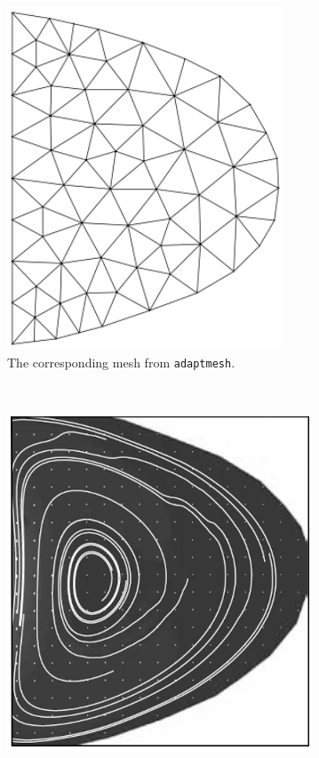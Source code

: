 \documentclass[12pt]{rmstyle}
\begin{document}
\begin{figure}[htbp]
\begin{subfigure}[b]{0.3\textwidth}
    \includegraphics[width=0.9\textwidth]{./esimerkki_2.png}
    \caption{The corresponding mesh from \texttt{adaptmesh}.}
    \label{fig:photomesh}
  \end{subfigure}
  \\
  \begin{subfigure}[b]{0.3\textwidth}
    \centering
    \includegraphics[width=\textwidth]{./esimerkki_3.png}

\end{subfigure}
\end{figure}
\end{document}
